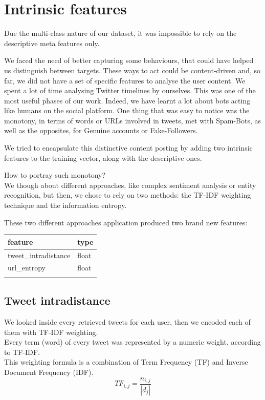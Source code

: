 \section{Intrinsic features}
Due the multi-class nature of our dataset, it was impossible to rely on the descriptive meta features only.

We faced the need of better capturing some behaviours, that could have helped us distinguish between targets. These ways to act could be content-driven and, so far, we did not have a set of specific features to analyse the user content.
We spent a lot of time analysing Twitter timelines by ourselves. This was one of the most useful phases of our work.
Indeed, we have learnt a lot about bots acting like humans on the social platform.
One thing that was easy to notice was the monotony, in terms of words or URLs involved in tweets, met with Spam-Bots, as well as the opposites, for Genuine accounts or Fake-Followers.

We tried to encapsulate this distinctive content posting by adding two intrinsic features to the training vector, along with the descriptive ones.

How to portray such monotony?\\
We though about different approaches, like complex sentiment analysis or entity recognition, but then, we chose to rely on two methods: the TF-IDF weighting technique and the information entropy.

These two different approaches application produced two brand new features:
\small
\begin{center}
	\begin{tabular}{ll}
		\\feature&type\\
		\hline\hline
		tweet\_intradistance&float\\
		url\_entropy&float\\\hline\\
	\end{tabular}
\end{center}
\normalsize

\subsection{Tweet intradistance}
We looked inside every retrieved tweets for each user, then we encoded each of them with TF-IDF weighting.\\

Every term (word) of every tweet was represented by a numeric weight, according to TF-IDF.\\
This weighting formula is a combination of Term Frequency (TF) and Inverse Document Frequency (IDF).
\[ TF_{i,j} =\frac {n_{i,j}}{|d_{j}|} \]

